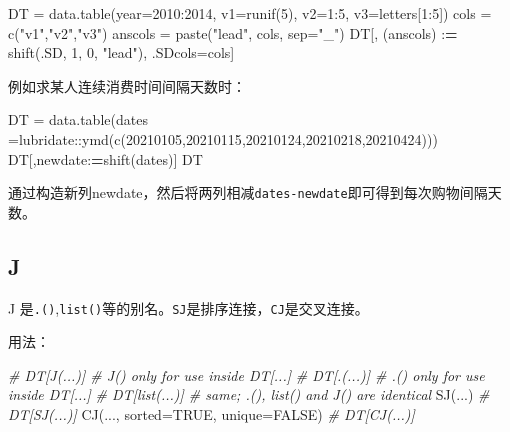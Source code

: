 \documentclass[
]{book}
\newenvironment{Shaded}{\begin{snugshade}}{\end{snugshade}}
\newcommand{\AttributeTok}[1]{\textcolor[rgb]{0.77,0.63,0.00}{#1}}
\newcommand{\CommentTok}[1]{\textcolor[rgb]{0.56,0.35,0.01}{\textit{#1}}}
\newcommand{\ConstantTok}[1]{\textcolor[rgb]{0.00,0.00,0.00}{#1}}
\newcommand{\DecValTok}[1]{\textcolor[rgb]{0.00,0.00,0.81}{#1}}
\newcommand{\ErrorTok}[1]{\textcolor[rgb]{0.64,0.00,0.00}{\textbf{#1}}}
\newcommand{\FunctionTok}[1]{\textcolor[rgb]{0.00,0.00,0.00}{#1}}
\newcommand{\NormalTok}[1]{#1}
\newcommand{\OtherTok}[1]{\textcolor[rgb]{0.56,0.35,0.01}{#1}}
\newcommand{\SpecialCharTok}[1]{\textcolor[rgb]{0.00,0.00,0.00}{#1}}
\newcommand{\StringTok}[1]{\textcolor[rgb]{0.31,0.60,0.02}{#1}}
\begin{document}
\begin{Shaded}
\begin{Highlighting}[]
\NormalTok{DT }\OtherTok{=} \FunctionTok{data.table}\NormalTok{(}\AttributeTok{year=}\DecValTok{2010}\SpecialCharTok{:}\DecValTok{2014}\NormalTok{, }\AttributeTok{v1=}\FunctionTok{runif}\NormalTok{(}\DecValTok{5}\NormalTok{), }\AttributeTok{v2=}\DecValTok{1}\SpecialCharTok{:}\DecValTok{5}\NormalTok{, }\AttributeTok{v3=}\NormalTok{letters[}\DecValTok{1}\SpecialCharTok{:}\DecValTok{5}\NormalTok{])}
\NormalTok{cols }\OtherTok{=} \FunctionTok{c}\NormalTok{(}\StringTok{"v1"}\NormalTok{,}\StringTok{"v2"}\NormalTok{,}\StringTok{"v3"}\NormalTok{)}
\NormalTok{anscols }\OtherTok{=} \FunctionTok{paste}\NormalTok{(}\StringTok{"lead"}\NormalTok{, cols, }\AttributeTok{sep=}\StringTok{"\_"}\NormalTok{)}
\NormalTok{DT[, (anscols) }\SpecialCharTok{:}\ErrorTok{=} \FunctionTok{shift}\NormalTok{(.SD, }\DecValTok{1}\NormalTok{, }\DecValTok{0}\NormalTok{, }\StringTok{"lead"}\NormalTok{), .SDcols}\OtherTok{=}\NormalTok{cols]}
\end{Highlighting}
\end{Shaded}

例如求某人连续消费时间间隔天数时：

\begin{Shaded}
\begin{Highlighting}[]
\NormalTok{DT }\OtherTok{=} \FunctionTok{data.table}\NormalTok{(}\AttributeTok{dates =}\NormalTok{lubridate}\SpecialCharTok{::}\FunctionTok{ymd}\NormalTok{(}\FunctionTok{c}\NormalTok{(}\DecValTok{20210105}\NormalTok{,}\DecValTok{20210115}\NormalTok{,}\DecValTok{20210124}\NormalTok{,}\DecValTok{20210218}\NormalTok{,}\DecValTok{20210424}\NormalTok{)))}
\NormalTok{DT[,newdate}\SpecialCharTok{:}\ErrorTok{=}\FunctionTok{shift}\NormalTok{(dates)]}
\NormalTok{DT}
\end{Highlighting}
\end{Shaded}

通过构造新列newdate，然后将两列相减\texttt{dates-newdate}即可得到每次购物间隔天数。

\hypertarget{j}{%
\subsection{J}\label{j}}

J 是\texttt{.()},\texttt{list()}等的别名。\texttt{SJ}是排序连接，\texttt{CJ}是交叉连接。

用法：

\begin{Shaded}
\begin{Highlighting}[]
\CommentTok{\# DT[J(...)]                          \# J() only for use inside DT[...]}
\CommentTok{\# DT[.(...)]                          \# .() only for use inside DT[...]}
\CommentTok{\# DT[list(...)]                       \# same; .(), list() and J() are identical}
\FunctionTok{SJ}\NormalTok{(...)                             }\CommentTok{\# DT[SJ(...)]}
\FunctionTok{CJ}\NormalTok{(..., }\AttributeTok{sorted=}\ConstantTok{TRUE}\NormalTok{, }\AttributeTok{unique=}\ConstantTok{FALSE}\NormalTok{)  }\CommentTok{\# DT[CJ(...)]}
\end{Highlighting}
\end{Shaded}
\end{document}
